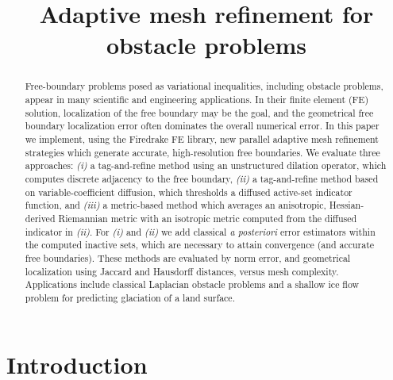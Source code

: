 \documentclass[]{interact}
\theoremstyle{plain}%
\theoremstyle{definition}
\theoremstyle{remark}
\begin{document}

\title{Adaptive mesh refinement for obstacle problems}

\author{
}

\maketitle

\begin{abstract}
Free-boundary problems posed as variational inequalities, including obstacle problems, appear in many scientific and engineering applications.  In their finite element (FE) solution, localization of the free boundary may be the goal, and the geometrical free boundary localization error often dominates the overall numerical error.  In this paper we implement, using the Firedrake FE library, new parallel adaptive mesh refinement strategies which generate accurate, high-resolution free boundaries.  We evaluate three approaches: \emph{(i)} a tag-and-refine method using an unstructured dilation operator, which computes discrete adjacency to the free boundary, \emph{(ii)} a tag-and-refine method based on variable-coefficient diffusion, which thresholds a diffused active-set indicator function, and \emph{(iii)} a metric-based method which averages an anisotropic, Hessian-derived Riemannian metric with an isotropic metric computed from the diffused indicator in \emph{(ii)}.  For \emph{(i)} and \emph{(ii)} we add classical \emph{a posteriori} error estimators within the computed inactive sets, which are necessary to attain convergence (and accurate free boundaries).  These methods are evaluated by norm error, and geometrical localization using Jaccard and Hausdorff distances, versus mesh complexity.  Applications include classical Laplacian obstacle problems and a shallow ice flow problem for predicting glaciation of a land surface.
\end{abstract}

%


\section{Introduction} \label{sec:intro}
\end{document}
